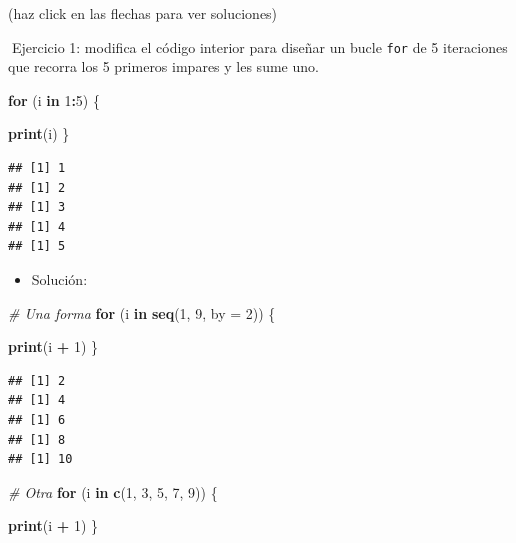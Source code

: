 \documentclass[11pt,]{book}
\newenvironment{Shaded}{\begin{snugshade}}{\end{snugshade}}
\newcommand{\CommentTok}[1]{\textcolor[rgb]{0.37,0.37,0.37}{\textit{#1}}}
\newcommand{\ControlFlowTok}[1]{\textcolor[rgb]{0.27,0.27,0.27}{\textbf{#1}}}
\newcommand{\DataTypeTok}[1]{\textcolor[rgb]{0.27,0.27,0.27}{#1}}
\newcommand{\DecValTok}[1]{\textcolor[rgb]{0.06,0.06,0.06}{#1}}
\newcommand{\KeywordTok}[1]{\textcolor[rgb]{0.27,0.27,0.27}{\textbf{#1}}}
\newcommand{\NormalTok}[1]{#1}
\newcommand{\OperatorTok}[1]{\textcolor[rgb]{0.43,0.43,0.43}{\textbf{#1}}}
\newcommand{\StringTok}[1]{\textcolor[rgb]{0.5,0.5,0.5}{#1}}
\providecommand{\tightlist}{%
  \setlength{\itemsep}{0pt}\setlength{\parskip}{0pt}}
\begin{document}
(haz click en las flechas para ver soluciones)

📝Ejercicio 1: modifica el código interior para diseñar un bucle \texttt{for} de 5 iteraciones que recorra los 5 primeros impares y les sume uno.

\begin{Shaded}
\begin{Highlighting}[]
\ControlFlowTok{for}\NormalTok{ (i }\ControlFlowTok{in} \DecValTok{1}\OperatorTok{:}\DecValTok{5}\NormalTok{) \{}
  
  \KeywordTok{print}\NormalTok{(i)}
\NormalTok{\}}
\end{Highlighting}
\end{Shaded}

\begin{verbatim}
## [1] 1
## [1] 2
## [1] 3
## [1] 4
## [1] 5
\end{verbatim}

\begin{itemize}
\tightlist
\item
  Solución:
\end{itemize}

\begin{Shaded}
\begin{Highlighting}[]
\CommentTok{# Una forma}
\ControlFlowTok{for}\NormalTok{ (i }\ControlFlowTok{in} \KeywordTok{seq}\NormalTok{(}\DecValTok{1}\NormalTok{, }\DecValTok{9}\NormalTok{, }\DataTypeTok{by =} \DecValTok{2}\NormalTok{)) \{}
  
  \KeywordTok{print}\NormalTok{(i }\OperatorTok{+}\StringTok{ }\DecValTok{1}\NormalTok{)}
\NormalTok{\}}
\end{Highlighting}
\end{Shaded}

\begin{verbatim}
## [1] 2
## [1] 4
## [1] 6
## [1] 8
## [1] 10
\end{verbatim}

\begin{Shaded}
\begin{Highlighting}[]
\CommentTok{# Otra}
\ControlFlowTok{for}\NormalTok{ (i }\ControlFlowTok{in} \KeywordTok{c}\NormalTok{(}\DecValTok{1}\NormalTok{, }\DecValTok{3}\NormalTok{, }\DecValTok{5}\NormalTok{, }\DecValTok{7}\NormalTok{, }\DecValTok{9}\NormalTok{)) \{}
  
  \KeywordTok{print}\NormalTok{(i }\OperatorTok{+}\StringTok{ }\DecValTok{1}\NormalTok{)}
\NormalTok{\}}
\end{Highlighting}
\end{Shaded}
\end{document}
